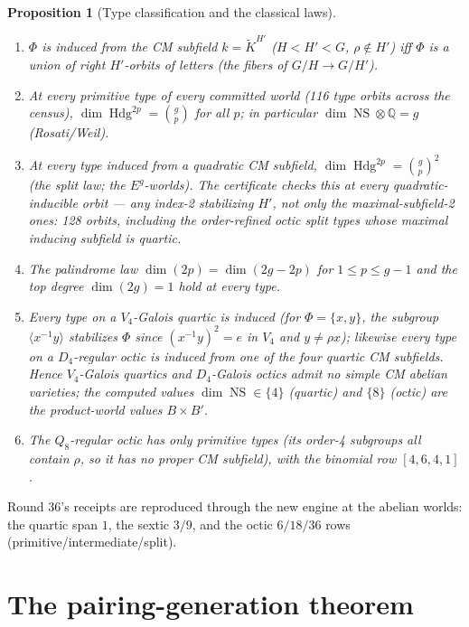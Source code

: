 \documentclass[11pt]{article}
\newtheorem{proposition}[theorem]{Proposition}
\begin{document}
\begin{proposition}[Type classification and the classical laws]\label{prop:laws}
\begin{enumerate}
\item $\Phi$ is induced from the CM subfield $k=\widetilde K^{H'}$
($H<H'<G$, $\rho\notin H'$) iff $\Phi$ is a union of right $H'$-orbits of
letters (the fibers of $G/H\to G/H'$).
\item At every \emph{primitive} type of every committed world (116 type
orbits across the census),
$\dim\operatorname{Hdg}^{2p}= \binom{g}{p}$ for all $p$; in particular
$\dim\operatorname{NS}\otimes\mathbb Q = g$ (Rosati/Weil).
\item At every type induced from a \emph{quadratic} CM subfield,
$\dim\operatorname{Hdg}^{2p}=\binom gp^2$ (the split law; the
$E^g$-worlds). The certificate checks this at every
\emph{quadratic-inducible} orbit --- any index-2 stabilizing $H'$, not only
the maximal-subfield-2 ones: 128 orbits, including the order-refined octic
split types whose maximal inducing subfield is quartic.
\item The palindrome law $\dim(2p)=\dim(2g-2p)$ for $1\le p\le g-1$ and
the top degree $\dim(2g)=1$ hold at every type.
\item Every type on a $V_4$-Galois quartic is induced (for
$\Phi=\{x,y\}$, the subgroup $\langle x^{-1}y\rangle$ stabilizes $\Phi$
since $(x^{-1}y)^2=e$ in $V_4$ and $y\ne\rho x$); likewise every type on a
$D_4$-\emph{regular} octic is induced from one of the four quartic CM
subfields. Hence $V_4$-Galois quartics and $D_4$-Galois octics admit no
simple CM abelian varieties; the computed values
$\dim\operatorname{NS}\in\{4\}$ (quartic) and $\{8\}$ (octic) are the
product-world values $B\times B'$.
\item The $Q_8$-regular octic has only primitive types (its order-4
subgroups all contain $\rho$, so it has no proper CM subfield), with the
binomial row $[4,6,4,1]$.
\end{enumerate}
\end{proposition}

Round 36's receipts are reproduced through the new engine at the abelian
worlds: the quartic span $1$, the sextic $3/9$, and the octic
$6/18/36$ rows (primitive/intermediate/split).

\section{The pairing-generation theorem}
\end{document}
